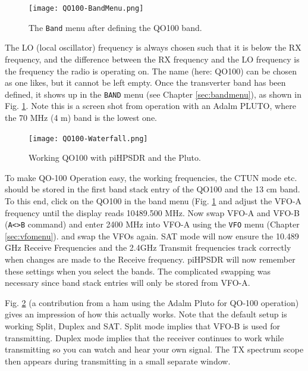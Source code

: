 \documentclass[12pt]{book}
\def\bltt#1{\texttt{\color{blue}#1}}
\def\pH{pi\-HPSDR\xspace}
\begin{document}
\begin{figure}[ht]
\center
\texttt{[image: QO100-BandMenu.png]}
\caption{The \bltt{Band} menu after defining the QO100 band.}
\label{fig:QO100-BandMenu}
\end{figure}

The LO (local oscillator) frequency is always chosen such that it is below the RX frequency,
and the difference between the RX frequency and the LO frequency is the frequency the radio
is operating on. The name (here: QO100) can be chosen as one likes, but it cannot be left
empty. Once the transverter band has been defined, it shows up in the \bltt{BAND} menu
(see Chapter \ref{sec:bandmenu}), as shown in Fig. \ref{fig:QO100-BandMenu}. Note this is
a screen shot from operation with an Adalm PLUTO, where the 70 MHz (4 m) band is the lowest one.

\begin{figure}[ht]
\center
\texttt{[image: QO100-Waterfall.png]}
\caption{Working QO100 with \pH and the Pluto.}
\label{fig:QO100-Waterfall}
\end{figure}



To make QO-100 Operation easy, the working frequencies, the CTUN mode etc. should be
stored in the first band stack entry of the QO100 and the 13 cm band. To this end,
click on the QO100 in the band menu (Fig. \ref{fig:QO100-BandMenu} and adjust the VFO-A
frequency until the display reads 10489.500 MHz. Now swap VFO-A and VFO-B (\bltt{A<>B} command)
and enter 2400 MHz into VFO-A using the \bltt{VFO} menu (Chapter \ref{sec:vfomenu}). and
swap the VFOs again. SAT mode will now ensure the 10.489 GHz Receive
Frequencies and the 2.4GHz Transmit frequencies track correctly when changes are made
to the Receive frequency. \pH will now remember these settings when you select
the bands. The complicated swapping was necessary since band stack entries will
only be stored from VFO-A.


Fig. \ref{fig:QO100-Waterfall} (a contribution from a ham using the Adalm Pluto for QO-100
operation) gives an impression of how this actually works.
Note that the
default setup
is working Split, Duplex and SAT. Split mode implies that VFO-B is used for transmitting.
Duplex mode implies that the receiver continues to work while transmitting so you can watch
and hear your own signal.
The TX spectrum scope then appears during transmitting in a small separate window.

\end{document}
